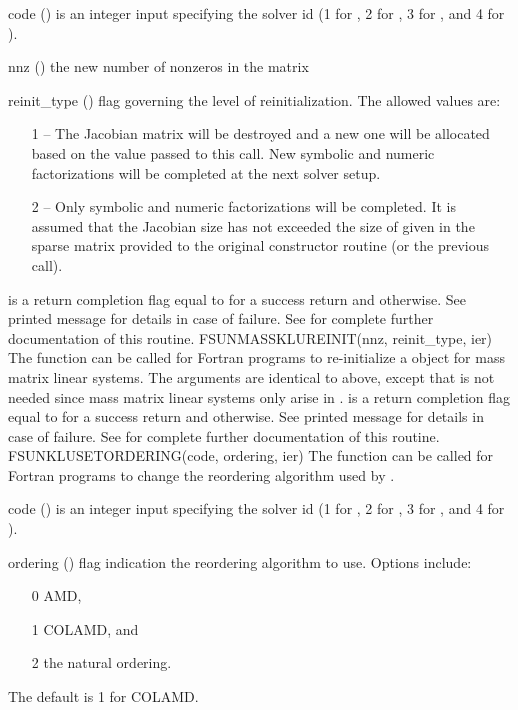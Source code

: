 {
  \begin{args}
  \item[code] ()
    is an integer input specifying the solver id (1 for {\cvode}, 2
    for {\ida}, 3 for {\kinsol}, and 4 for {\arkode}).
  \item[nnz] ()
    the new number of nonzeros in the matrix
  \item[reinit\_type] ()
    flag governing the level of reinitialization.  The allowed values
    are:
    \begin{itemize}
    \item[1] -- The Jacobian matrix will be
      destroyed and a new one will be allocated based on the 
      value passed to this call.  New symbolic and numeric
      factorizations will be completed at the next solver setup. 
    \item[2] -- Only symbolic and numeric 
      factorizations will be completed.  It is assumed that the
      Jacobian size has not exceeded the size of  given in the
      sparse matrix provided to the original constructor routine (or
      the previous  call). 
    \end{itemize}
  \end{args}
}
{
   is a  return completion flag equal to  for a success
  return and  otherwise. See printed message for details in case
  of failure.
}
{
  See  for complete further documentation of
  this routine. 
}
{
  FSUNMASSKLUREINIT(nnz, reinit\_type, ier)
}
{
  The function  can be called for Fortran programs
  to re-initialize a {\sunlinsolklu} object for mass matrix linear systems.
}
{
  The arguments are identical to  above, except that
   is not needed since mass matrix linear systems only arise
  in {\arkode}.
}
{
   is a  return completion flag equal to  for a success
  return and  otherwise. See printed message for details in case
  of failure.
}
{
  See  for complete further documentation of
  this routine. 
}
{
  FSUNKLUSETORDERING(code, ordering, ier)
}
{
  The function  can be called for Fortran programs
  to change the reordering algorithm used by {\klu}.
}
{
  \begin{args}[ordering]
  \item[code] ()
    is an integer input specifying the solver id (1 for {\cvode}, 2
    for {\ida}, 3 for {\kinsol}, and 4 for {\arkode}).
  \item[ordering] ()
    flag indication the reordering algorithm to use.  Options include:
    \begin{itemize}
    \item[0] AMD,
    \item[1] COLAMD, and
    \item[2] the natural ordering.
    \end{itemize}
    The default is 1 for COLAMD.
  \end{args}
}
